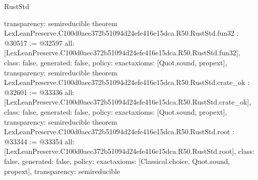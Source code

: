 \begin{lexlean}{RustStd}
\begin{coremodule}
{  transparency: semireducible
}
theorem LexLeanPreserve.C100d0aec372b51094d24efe416e15dca.R50.RustStd.fun32 : @30517 := @32597 {
  all: [LexLeanPreserve.C100d0aec372b51094d24efe416e15dca.R50.RustStd.fun32],
  class: false,
  generated: false,
  policy: exact{axioms: [Quot.sound, propext]},
  transparency: semireducible
}
theorem LexLeanPreserve.C100d0aec372b51094d24efe416e15dca.R50.RustStd.crate_ok : @32601 := @33336 {
  all: [LexLeanPreserve.C100d0aec372b51094d24efe416e15dca.R50.RustStd.crate_ok],
  class: false,
  generated: false,
  policy: exact{axioms: [Quot.sound, propext]},
  transparency: semireducible
}
theorem LexLeanPreserve.C100d0aec372b51094d24efe416e15dca.R50.RustStd.root : @33344 := @33354 {
  all: [LexLeanPreserve.C100d0aec372b51094d24efe416e15dca.R50.RustStd.root],
  class: false,
  generated: false,
  policy: exact{axioms: [Classical.choice, Quot.sound, propext]},
  transparency: semireducible
}


\end{coremodule}
\end{lexlean}
